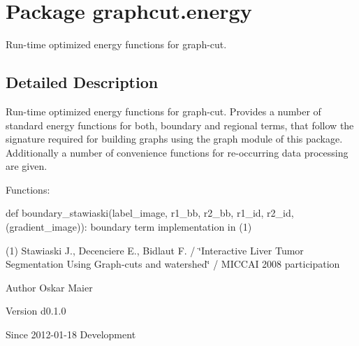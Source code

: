 \hypertarget{namespacegraphcut_1_1energy}{
\section{Package graphcut.energy}
\label{namespacegraphcut_1_1energy}
}


Run-\/time optimized energy functions for graph-\/cut.  




\subsection{Detailed Description}
Run-\/time optimized energy functions for graph-\/cut. Provides a number of standard energy functions for both, boundary and regional terms, that follow the signature required for building graphs using the graph module of this package. Additionally a number of convenience functions for re-\/occurring data processing are given.

Functions:
\begin{DoxyItemize}
\item def boundary\_\-stawiaski(label\_\-image, r1\_\-bb, r2\_\-bb, r1\_\-id, r2\_\-id, (gradient\_\-image)): boundary term implementation in (1)
\end{DoxyItemize}

(1) Stawiaski J., Decenciere E., Bidlaut F. / \char`\"{}Interactive Liver Tumor Segmentation
 Using Graph-\/cuts and watershed\char`\"{} / MICCAI 2008 participation

\begin{DoxyAuthor}{Author}
Oskar Maier 
\end{DoxyAuthor}
\begin{DoxyVersion}{Version}
d0.1.0 
\end{DoxyVersion}
\begin{DoxySince}{Since}
2012-\/01-\/18  Development 
\end{DoxySince}
